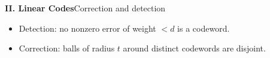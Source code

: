 %

\begin{frame}{\textbf{II. Linear Codes}}{Correction and detection}
\small
{}
\begin{itemize}
  \item Detection: no nonzero error of weight $<d$ is a codeword.
  \item Correction: balls of radius $t$ around distinct codewords are disjoint.
\end{itemize}
\end{frame}

